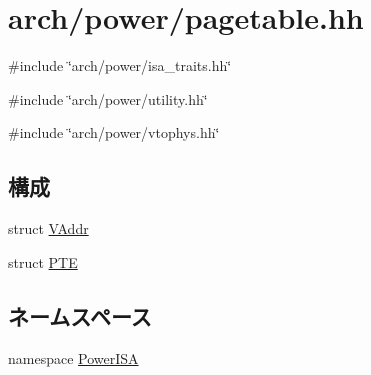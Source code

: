 \hypertarget{power_2pagetable_8hh}{
\section{arch/power/pagetable.hh}
\label{power_2pagetable_8hh}
}
{\ttfamily \#include \char`\"{}arch/power/isa\_\-traits.hh\char`\"{}}\par
{\ttfamily \#include \char`\"{}arch/power/utility.hh\char`\"{}}\par
{\ttfamily \#include \char`\"{}arch/power/vtophys.hh\char`\"{}}\par
\subsection*{構成}
\begin{DoxyCompactItemize}
\item 
struct \hyperlink{structPowerISA_1_1VAddr}{VAddr}
\item 
struct \hyperlink{structPowerISA_1_1PTE}{PTE}
\end{DoxyCompactItemize}
\subsection*{ネームスペース}
\begin{DoxyCompactItemize}
\item 
namespace \hyperlink{namespacePowerISA}{PowerISA}
\end{DoxyCompactItemize}
